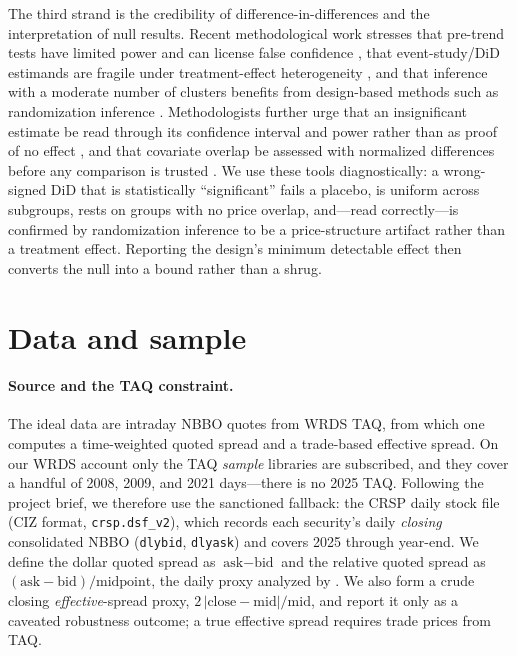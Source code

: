 \documentclass[12pt]{article}
\begin{document}
The third strand is the credibility of difference-in-differences and the interpretation of null
results. Recent methodological work stresses that pre-trend tests have limited power and can
license false confidence \citep{roth2022}, that event-study/DiD estimands are fragile under
treatment-effect heterogeneity \citep{callaway2021}, and that inference with a moderate number
of clusters benefits from design-based methods such as randomization inference
\citep{young2019}. Methodologists further urge that an insignificant estimate be read through
its confidence interval and power rather than as proof of no effect \citep{abadie2020}, and that
covariate overlap be assessed with normalized differences before any comparison is trusted
\citep{imbens2015}. We use these tools diagnostically: a wrong-signed DiD that is statistically
``significant'' fails a placebo, is uniform across subgroups, rests on groups with no price
overlap, and---read correctly---is confirmed by randomization inference to be a price-structure
artifact rather than a treatment effect. Reporting the design's minimum detectable effect then
converts the null into a bound rather than a shrug.

\section{Data and sample}\label{sec:data}
\paragraph{Source and the TAQ constraint.} The ideal data are intraday NBBO quotes from
WRDS TAQ, from which one computes a time-weighted quoted spread and a trade-based effective
spread. On our WRDS account only the TAQ \emph{sample} libraries are subscribed, and they
cover a handful of 2008, 2009, and 2021 days---there is no 2025 TAQ. Following the project
brief, we therefore use the sanctioned fallback: the CRSP daily stock file (CIZ format,
\texttt{crsp.dsf\_v2}), which records each security's daily \emph{closing} consolidated NBBO
(\texttt{dlybid}, \texttt{dlyask}) and covers 2025 through year-end. We define the dollar
quoted spread as $\text{ask}-\text{bid}$ and the relative quoted spread as
$(\text{ask}-\text{bid})/\text{midpoint}$, the daily proxy analyzed by \citet{chung2014}.
We also form a crude closing \emph{effective}-spread proxy,
$2\,|\text{close}-\text{mid}|/\text{mid}$, and report it only as a caveated robustness
outcome; a true effective spread requires trade prices from TAQ.
\end{document}

